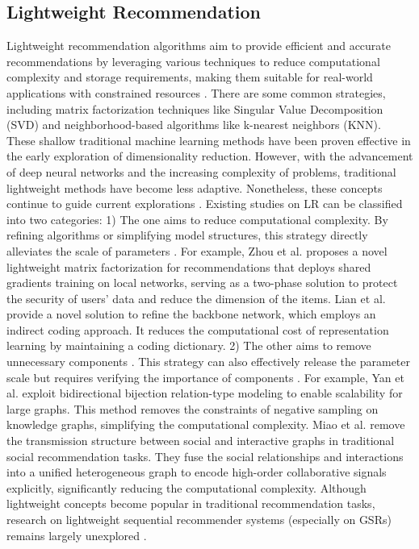 \subsection{Lightweight Recommendation}
\noindent Lightweight recommendation algorithms aim to provide efficient and accurate recommendations by leveraging various techniques to reduce computational complexity and storage requirements, making them suitable for real-world applications with constrained resources \cite{XvLL0LH22,ZhouYXBW23,KnyazevO23}. There are some common strategies, including matrix factorization techniques like Singular Value Decomposition (SVD) \cite{kalman1996singularly} and neighborhood-based algorithms like k-nearest neighbors (KNN). These shallow traditional machine learning methods have been proven effective in the early exploration of dimensionality reduction. However, with the advancement of deep neural networks and the increasing complexity of problems, traditional lightweight methods have become less adaptive. Nonetheless, these concepts continue to guide current explorations \cite{ShiLWZ23}. Existing studies on \ac{LR} can be classified into two categories: 
1) The one aims to reduce computational complexity. By refining algorithms or simplifying model structures, this strategy directly alleviates the scale of parameters \cite{lea23dasfaa,ZhouYXBW23}. 
For example, Zhou et al. \cite{ZhouYXBW23} proposes a novel lightweight matrix factorization for recommendations that deploys shared gradients training on local networks, serving as a two-phase solution to protect the security of users’ data and reduce the dimension of the items. 
Lian et al. \cite{LianWLLC020} provide a novel solution to refine the backbone network, which employs an indirect coding approach. It reduces the computational cost of representation learning by maintaining a coding dictionary.
2) The other aims to remove unnecessary components \cite{MeiZK22}. This strategy can also effectively release the parameter scale but requires verifying the importance of components \cite{YanLZW22,KnyazevO23,MiaoLY22}. For example, Yan et al. \cite{YanLZW22} exploit bidirectional bijection relation-type modeling to enable scalability for large graphs. This method removes the constraints of negative sampling on knowledge graphs, simplifying the computational complexity. 
Miao et al. \cite{MiaoLY22} remove the transmission structure between social and interactive graphs in traditional social recommendation tasks. They fuse the social relationships and interactions into a unified heterogeneous graph to encode high-order collaborative signals explicitly, significantly reducing the computational complexity.  
Although lightweight concepts become popular in traditional recommendation tasks, research on lightweight sequential recommender systems (especially on GSRs) remains largely unexplored \cite{LiCZY21}.

